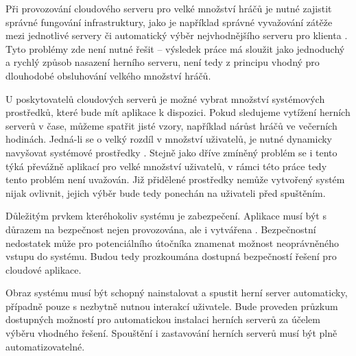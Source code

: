 \documentclass[thesis=B,czech]{FITthesis}[2019/12/23]
\begin{document}
Při provozování cloudového serveru pro velké množství hráčů je nutné zajistit správné fungování infrastruktury,
jako je například správné vyvažování zátěže mezi jednotlivé servery či automatický výběr nejvhodnějšího serveru
pro klienta \cite{building_cloud_mog_server}. Tyto problémy zde není nutné řešit -- výsledek práce má sloužit jako jednoduchý a rychlý
způsob nasazení herního serveru, není tedy z principu vhodný pro dlouhodobé obsluhování velkého množství hráčů.

U poskytovatelů cloudových serverů je možné vybrat množství systémových prostředků, které bude mít aplikace k dispozici.
Pokud sledujeme vytížení herních serverů v čase, můžeme spatřit jisté vzory, například nárůst hráčů ve večerních hodinách.
Jedná-li se o velký rozdíl v množství uživatelů, je nutné dynamicky navyšovat systémové prostředky \cite{efficient_resources}.
Stejně jako dříve zmíněný problém se i tento týká převážně aplikací pro velké množství uživatelů, v rámci této práce tedy tento problém není uvažován.
Již přidělené prostředky nemůže vytvořený systém nijak ovlivnit, jejich výběr bude tedy ponechán na uživateli před spuštěním.

Důležitým prvkem kteréhokoliv systému je zabezpečení. Aplikace musí být s důrazem na bezpečnost nejen provozována,
ale i vytvářena \cite{newcombe_2012}. Bezpečnostní nedostatek může pro potenciálního útočníka znamenat možnost neoprávněného vstupu do systému.
Budou tedy prozkoumána dostupná bezpečností řešení pro cloudové aplikace.

Obraz systému musí být schopný nainstalovat a spustit herní server automaticky, případně pouze s nezbytně nutnou interakcí uživatele.
Bude proveden průzkum dostupných možností pro automatickou instalaci herních serverů za účelem výběru vhodného řešení.
Spouštění i zastavování herních serverů musí být plně automatizovatelné.


\end{document}
